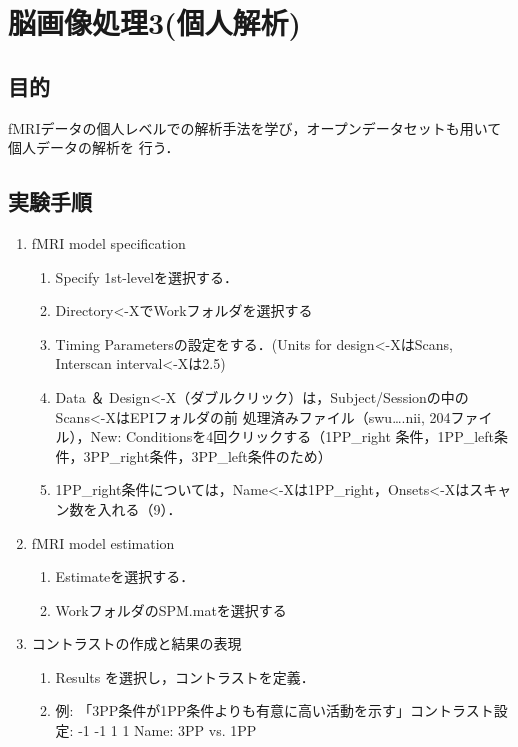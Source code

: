 \documentclass{jlreq}
\begin{document}
\section{脳画像処理3(個人解析)}
\subsection{目的}
fMRIデータの個人レベルでの解析手法を学び，オープンデータセットも用いて個人データの解析を
行う．
\subsection{実験手順}
\begin{enumerate}
    \item fMRI model specification
    \begin{enumerate}
        \item Specify 1st-levelを選択する．
        \item Directory<-XでWorkフォルダを選択する
        \item Timing Parametersの設定をする．(Units for design<-XはScans, Interscan interval<-Xは2.5)
        \item Data ＆ Design<-X（ダブルクリック）は，Subject/Sessionの中のScans<-XはEPIフォルダの前
        処理済みファイル（swu….nii, 204ファイル），New: Conditionsを4回クリックする（1PP\_right
        条件，1PP\_left条件，3PP\_right条件，3PP\_left条件のため）
        \item 1PP\_right条件については，Name<-Xは1PP\_right，Onsets<-Xはスキャン数を入れる（9）．
    \end{enumerate}

    \item fMRI model estimation
    \begin{enumerate}
        \item Estimateを選択する．
        \item WorkフォルダのSPM.matを選択する
    \end{enumerate}

    \item コントラストの作成と結果の表現
    \begin{enumerate}
        \item Results を選択し，コントラストを定義．
        \item 例: 「3PP条件が1PP条件よりも有意に高い活動を示す」コントラスト設定: -1 -1 1 1 Name: 3PP vs. 1PP
    \end{enumerate}
\end{enumerate}
\end{document}
